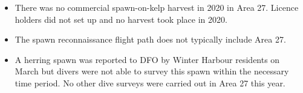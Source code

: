 \begin{itemize}

\item There was no commercial spawn-on-kelp harvest in 2020 in Area 27.
Licence holders did not set up and no harvest took place in 2020.

\item The spawn reconnaissance flight path does not typically include Area 27.

\item A herring spawn was reported to DFO by Winter Harbour residents on March  but divers were not able to survey this spawn within the necessary time period.
No other dive surveys were carried out in Area 27 this year.

\end{itemize}
